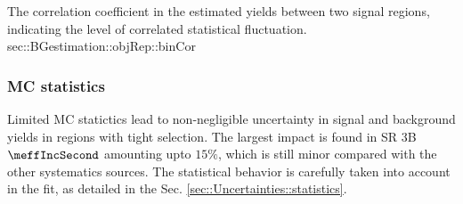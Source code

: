 {The correlation coefficient in the estimated yields between two signal regions, indicating the level of correlated statistical fluctuation.}
{sec::BGestimation::objRep::binCor}



\subsubsection{MC statistics}
Limited MC statictics lead to non-negligible uncertainty in signal and background yields in regions with tight selection. The largest impact is found in SR 3B $\meffIncSecond$ amounting upto $15\%$, which is still minor compared with the other systematics sources. The statistical behavior is carefully taken into account in the fit, as detailed in the Sec. \ref{sec::Uncertainties::statistics}.









